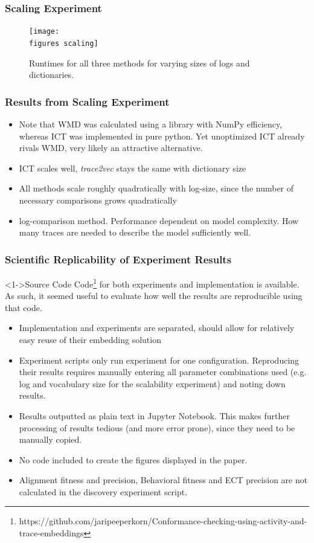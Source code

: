 \documentclass{beamer}
\newcommand{\figures}{../figures/}
\newcommand{\pro}{\item[\color{green}\textbf{+}\color{black}]}
\newcommand{\con}{\item[\color{red}\boldmath{$-$}\color{black}]}
\begin{document}
	
	\begin{frame}
		\frametitle{Scaling Experiment}
		\begin{figure}
			\texttt{[image: \\figures scaling]}
			\caption{Runtimes for all three methods for varying sizes of logs and dictionaries.}
			\label{fig:scalability}
		\end{figure}
	\end{frame}
	
	
	\begin{frame}
		\frametitle{Results from Scaling Experiment}
		\begin{itemize}
			\item Note that WMD was calculated using a library with NumPy efficiency, whereas ICT was implemented in pure python. Yet unoptimized ICT already rivals WMD, very likely an attractive alternative.
			\item ICT scales well, \emph{trace2vec} stays the same with dictionary size
			\item All methods scale roughly quadratically with log-size, since the number of necessary comparisons grows quadratically
			\item log-comparison method. Performance dependent on model complexity. How many traces are needed to describe the model sufficiently well.
		\end{itemize}
	\end{frame}
	
	\begin{frame}
		\frametitle{Scientific Replicability of Experiment Results}
		\begin{block}<1->{Source Code}
				 Code\footnote{https://github.com/jaripeeperkorn/Conformance-checking-using-activity-and-trace-embeddings} for both experiments and implementation is available. As such, it seemed useful to evaluate how well the results are reproducible using that code.
		\end{block}
		\begin{itemize}
			 \pro<2-> Implementation and experiments are separated, should allow for relatively easy reuse of their embedding solution
			 \con<3-> Experiment scripts only run experiment for one configuration. Reproducing their results requires manually entering all parameter combinations used (e.g. log and vocabulary size for the scalability experiment) and noting down results.
			 \con<4-> Results outputted as plain text in Jupyter Notebook. This makes further processing of results tedious (and more error prone), since they need to be manually copied.
			 \con<5-> No code included to create the figures displayed in the paper.
			 \con<6-> Alignment fitness and precision, Behavioral fitness and ECT precision are not calculated in the discovery experiment script.
		\end{itemize}
	\end{frame}
	
\end{document}
